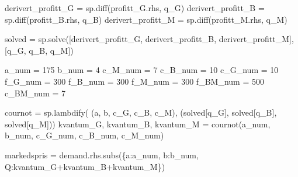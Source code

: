 \documentclass[
  12pt,
  a4paper,
  DIV=11,
  numbers=noendperiod]{scrartcl}
\newenvironment{Shaded}{\begin{snugshade}}{\end{snugshade}}
\newcommand{\DecValTok}[1]{\textcolor[rgb]{0.68,0.00,0.00}{#1}}
\newcommand{\NormalTok}[1]{\textcolor[rgb]{0.00,0.23,0.31}{#1}}
\newcommand{\OperatorTok}[1]{\textcolor[rgb]{0.37,0.37,0.37}{#1}}
\begin{document}
\begin{Shaded}
\begin{Highlighting}[]
\NormalTok{derivert\_profitt\_G }\OperatorTok{=}\NormalTok{ sp.diff(profitt\_G.rhs, q\_G)}
\NormalTok{derivert\_profitt\_B }\OperatorTok{=}\NormalTok{ sp.diff(profitt\_B.rhs, q\_B)}
\NormalTok{derivert\_profitt\_M }\OperatorTok{=}\NormalTok{ sp.diff(profitt\_M.rhs, q\_M)}

\NormalTok{solved }\OperatorTok{=}\NormalTok{ sp.solve([derivert\_profitt\_G, derivert\_profitt\_B, derivert\_profitt\_M], [q\_G, q\_B, q\_M])}
\end{Highlighting}
\end{Shaded}

\begin{Shaded}
\begin{Highlighting}[]
\NormalTok{a\_num }\OperatorTok{=} \DecValTok{175}
\NormalTok{b\_num }\OperatorTok{=} \DecValTok{4}
\NormalTok{c\_M\_num }\OperatorTok{=} \DecValTok{7}
\NormalTok{c\_B\_num }\OperatorTok{=} \DecValTok{10}
\NormalTok{c\_G\_num }\OperatorTok{=} \DecValTok{10}
\NormalTok{f\_G\_num }\OperatorTok{=} \DecValTok{300}
\NormalTok{f\_B\_num }\OperatorTok{=} \DecValTok{300}
\NormalTok{f\_M\_num }\OperatorTok{=} \DecValTok{300}
\NormalTok{f\_BM\_num }\OperatorTok{=} \DecValTok{500}
\NormalTok{c\_BM\_num }\OperatorTok{=} \DecValTok{7}

\NormalTok{cournot }\OperatorTok{=}\NormalTok{ sp.lambdify(}
\NormalTok{    (a, b, c\_G, c\_B, c\_M), }
\NormalTok{    (solved[q\_G], solved[q\_B], solved[q\_M]))}
\NormalTok{kvantum\_G, kvantum\_B, kvantum\_M }\OperatorTok{=}\NormalTok{ cournot(a\_num, b\_num, c\_G\_num, c\_B\_num, c\_M\_num)}

\NormalTok{markedspris }\OperatorTok{=}\NormalTok{ demand.rhs.subs(\{a:a\_num, b:b\_num, Q:kvantum\_G}\OperatorTok{+}\NormalTok{kvantum\_B}\OperatorTok{+}\NormalTok{kvantum\_M\})}
\end{Highlighting}
\end{Shaded}
\end{document}
